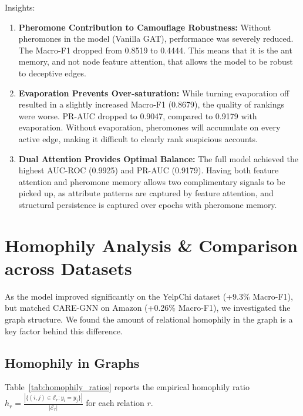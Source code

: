 Insights:

\begin{enumerate}
    \item \textbf{Pheromone Contribution to Camouflage Robustness:} Without pheromones in the model (Vanilla GAT), performance was severely reduced. The Macro-F1 dropped from 0.8519 to 0.4444. This means that it is the ant memory, and not node feature attention, that allows the model to be robust to deceptive edges.
    
    \item \textbf{Evaporation Prevents Over-saturation:} While turning evaporation off resulted in a slightly increased Macro-F1 (0.8679), the quality of rankings were worse. PR-AUC dropped to 0.9047, compared to 0.9179 with evaporation. Without evaporation, pheromones will accumulate on every active edge, making it difficult to clearly rank suspicious accounts.
    
    \item \textbf{Dual Attention Provides Optimal Balance:} The full model achieved the highest AUC-ROC (0.9925) and PR-AUC (0.9179). Having both feature attention and pheromone memory allows two complimentary signals to be picked up, as attribute patterns are captured by feature attention, and structural persistence is captured over epochs with pheromone memory.
\end{enumerate}

\section[Homophily Analysis \& Comparison across Datasets]{Homophily Analysis \& Comparison\\[2pt]across Datasets}
\label{sec:homophily}

As the model improved significantly on the YelpChi dataset (+9.3\% Macro-F1), but matched CARE-GNN on Amazon (+0.26\% Macro-F1), we investigated the graph structure. We found the amount of relational homophily in the graph is a key factor behind this difference.

\subsection{Homophily in Graphs}

Table~\ref{tab:homophily_ratios} reports the empirical homophily ratio $h_r = \frac{|\{(i,j) \in \mathcal{E}_r : y_i = y_j\}|}{|\mathcal{E}_r|}$ for each relation $r$.

